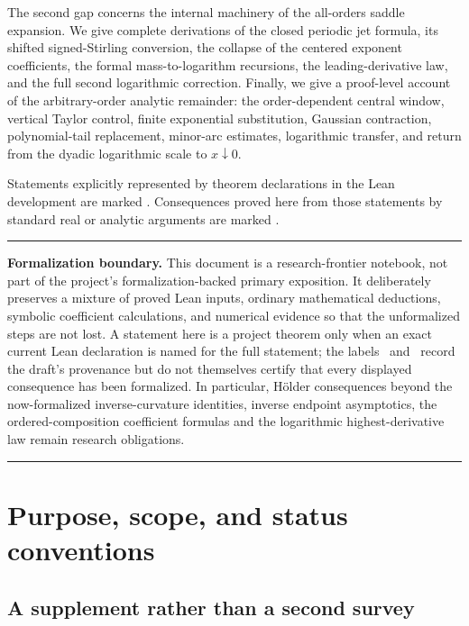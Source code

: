 \documentclass[11pt,oneside]{article}
\theoremstyle{definition}
\theoremstyle{remark}
\newenvironment{boxedremark}{%
  \par\smallskip\noindent\begin{center}\begin{minipage}{0.94\textwidth}%
  \color{black}\hrule\vspace{0.6em}\small
}{%
  \vspace{0.6em}\hrule\end{minipage}\end{center}\smallskip
}
\begin{document}
The second gap concerns the internal machinery of the all-orders saddle
expansion.  We give complete derivations of the closed periodic jet
formula, its shifted signed-Stirling conversion, the collapse of the
centered exponent coefficients, the formal mass-to-logarithm recursions,
the leading-derivative law, and the full second logarithmic correction.
Finally, we give a proof-level account of the arbitrary-order analytic
remainder: the order-dependent central window, vertical Taylor control,
finite exponential substitution, Gaussian contraction, polynomial-tail
replacement, minor-arc estimates, logarithmic transfer, and return from
the dyadic logarithmic scale to $x\downarrow0$.

Statements explicitly represented by theorem declarations in the Lean
development are marked \Formalized.  Consequences proved here from those
statements by standard real or analytic arguments are marked \Derived.


\begin{boxedremark}
\textbf{Formalization boundary.}
This document is a research-frontier notebook, not part of the project's
formalization-backed primary exposition.  It deliberately preserves a mixture of proved
Lean inputs, ordinary mathematical deductions, symbolic coefficient calculations, and
numerical evidence so that the unformalized steps are not lost.  A statement here is a
project theorem only when an exact current Lean declaration is named for the full statement;
the labels \Formalized\ and \Derived\ record the draft's provenance but do not themselves
certify that every displayed consequence has been formalized.  In particular, H\"older
consequences beyond the now-formalized inverse-curvature identities, inverse endpoint
asymptotics, the ordered-composition coefficient formulas and the logarithmic
highest-derivative law remain research obligations.
\end{boxedremark}

\section{Purpose, scope, and status conventions}

\subsection{A supplement rather than a second survey}
\end{document}
